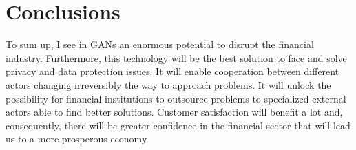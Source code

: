 \documentclass[runningheads]{llncs}
\begin{document}
\section{Conclusions}
To sum up, I see in GANs an enormous potential to disrupt the financial industry. Furthermore, this technology will be the best solution to face and solve privacy and data protection issues. It will enable cooperation between different actors changing irreversibly the way to approach problems. It will unlock the possibility for financial institutions to outsource problems to specialized external actors able to find better solutions. Customer satisfaction will benefit a lot and, consequently, there will be greater confidence in the financial sector that will lead us to a more prosperous economy.
%
%
%
% 
% 
%
\end{document}
